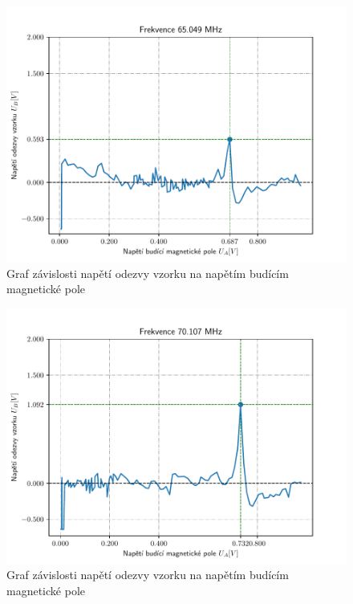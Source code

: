 \documentclass{article}
\begin{document}
\begin{figure}[!h]
  \hspace*{-10em}
  \includegraphics[scale=1.2]{figs/5.pdf}
  \caption{Graf závislosti napětí odezvy vzorku na napětím budícím magnetické pole}
\end{figure}
\begin{figure}[!h]
  \hspace*{-10em}
  \includegraphics[scale=1.2]{figs/6.pdf}
  \caption{Graf závislosti napětí odezvy vzorku na napětím budícím magnetické pole}
\end{figure}
\end{document}
